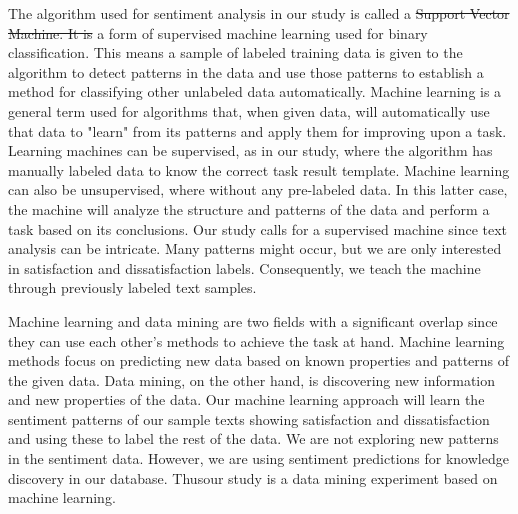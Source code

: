 \documentclass[smallextended,natbib]{svjour3}       %
\providecommand{\DIFadd}[1]{{\protect\color{blue}\uwave{#1}}} %
\providecommand{\DIFdel}[1]{{\protect\color{red}\sout{#1}}}                      %
\providecommand{\DIFaddbegin}{} %
\providecommand{\DIFaddend}{} %
\providecommand{\DIFdelbegin}{} %
\providecommand{\DIFdelend}{} %
\newcommand{\DIFscaledelfig}{0.5}
\newlength{\DIFdelgraphicswidth} %
\newlength{\DIFdelgraphicsheight} %
\newcommand{\DIFaddincludegraphics}[2][]{{\color{blue}\fbox{\DIFOincludegraphics[#1]{#2}}}} %
\newcommand{\DIFdelincludegraphics}[2][]{%
\sbox{\DIFdelgraphicsbox}{\DIFOincludegraphics[#1]{#2}}%
\settoboxwidth{\DIFdelgraphicswidth}{\DIFdelgraphicsbox} %
\settoboxtotalheight{\DIFdelgraphicsheight}{\DIFdelgraphicsbox} %
\scalebox{\DIFscaledelfig}{%
\parbox[b]{\DIFdelgraphicswidth}{\usebox{\DIFdelgraphicsbox}\\[-\baselineskip] \rule{\DIFdelgraphicswidth}{0em}}\llap{\resizebox{\DIFdelgraphicswidth}{\DIFdelgraphicsheight}{%
\setlength{\unitlength}{\DIFdelgraphicswidth}%
\begin{picture}(1,1)%
\thicklines\linethickness{2pt} %
{\color[rgb]{1,0,0}\put(0,0){\framebox(1,1){}}}%
{\color[rgb]{1,0,0}\put(0,0){\line( 1,1){1}}}%
{\color[rgb]{1,0,0}\put(0,1){\line(1,-1){1}}}%
\end{picture}%
}\hspace*{3pt}}} %
} %
\DeclareRobustCommand{\DIFaddbegin}{\DIFOaddbegin \let\includegraphics\DIFaddincludegraphics} %
\DeclareRobustCommand{\DIFaddend}{\DIFOaddend \let\includegraphics\DIFOincludegraphics} %
\DeclareRobustCommand{\DIFdelbegin}{\DIFOdelbegin \let\includegraphics\DIFdelincludegraphics} %
\DeclareRobustCommand{\DIFdelend}{\DIFOaddend \let\includegraphics\DIFOincludegraphics} %
\begin{document}
    The algorithm used for sentiment analysis in our study is called a \DIFdelbegin \DIFdel{Support Vector Machine. It is }\DIFdelend \DIFaddbegin \DIFadd{support vector machine, }\DIFaddend a form of supervised machine learning used for binary classification. This means a sample of labeled training data is given to the algorithm to detect patterns in the data and use those patterns to establish a method for classifying other unlabeled data automatically. Machine learning is a general term used for algorithms that, when given data, will automatically use that data to "learn" from its patterns and apply them for improving upon a task. Learning machines can be supervised, as in our study, where the algorithm has manually labeled data to know the correct task result template. Machine learning can also be unsupervised, where without any pre-labeled data. In this latter case, the machine will analyze the structure and patterns of the data and perform a task based on its conclusions. Our study calls for a supervised machine since text analysis can be intricate. Many patterns might occur, but we are only interested in satisfaction and dissatisfaction labels. Consequently, we teach the machine through previously labeled text samples. 

    Machine learning and data mining are two fields with a significant overlap since they can use each other's methods to achieve the task at hand. Machine learning methods focus on predicting new data based on known properties and patterns of the given data. Data mining, on the other hand, is discovering new information and new properties of the data. Our machine learning approach will learn the sentiment patterns of our sample texts showing satisfaction and dissatisfaction and using these to label the rest of the data. We are not exploring new patterns in the sentiment data. However, we are using sentiment predictions for knowledge discovery in our database. Thus\DIFaddbegin \DIFadd{, }\DIFaddend our study is a data mining experiment based on machine learning.
\end{document}
